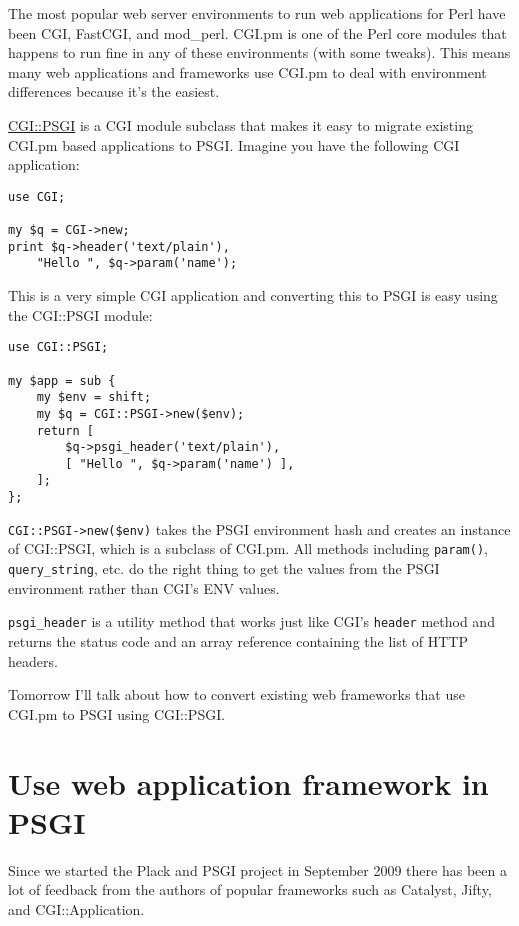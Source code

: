 The most popular web server environments to run web applications for
Perl have been CGI, FastCGI, and mod\_perl. CGI.pm is one of the Perl
core modules that happens to run fine in any of these environments (with
some tweaks). This means many web applications and frameworks use CGI.pm
to deal with environment differences because it's the easiest.

\href{http://search.cpan.org/perldoc?CGI::PSGI}{CGI::PSGI} is a CGI
module subclass that makes it easy to migrate existing CGI.pm based
applications to PSGI. Imagine you have the following CGI application:

\begin{lstlisting}
use CGI;

my $q = CGI->new;
print $q->header('text/plain'),
    "Hello ", $q->param('name');
\end{lstlisting}

This is a very simple CGI application and converting this to PSGI is
easy using the CGI::PSGI module:

\begin{lstlisting}
use CGI::PSGI;

my $app = sub {
    my $env = shift;
    my $q = CGI::PSGI->new($env);
    return [
        $q->psgi_header('text/plain'),
        [ "Hello ", $q->param('name') ],
    ];
};
\end{lstlisting}

\lstinline!CGI::PSGI->new($env)! takes the PSGI environment hash and
creates an instance of CGI::PSGI, which is a subclass of CGI.pm. All
methods including \lstinline!param()!, \lstinline!query_string!, etc. do
the right thing to get the values from the PSGI environment rather than
CGI's ENV values.

\lstinline!psgi_header! is a utility method that works just like CGI's
\lstinline!header! method and returns the status code and an array
reference containing the list of HTTP headers.

Tomorrow I'll talk about how to convert existing web frameworks that use
CGI.pm to PSGI using CGI::PSGI.

\chapter{Use web application framework in
PSGI}\label{day-7-use-web-application-framework-in-psgi}

Since we started the Plack and PSGI project in September 2009 there has
been a lot of feedback from the authors of popular frameworks such as
Catalyst, Jifty, and CGI::Application.

